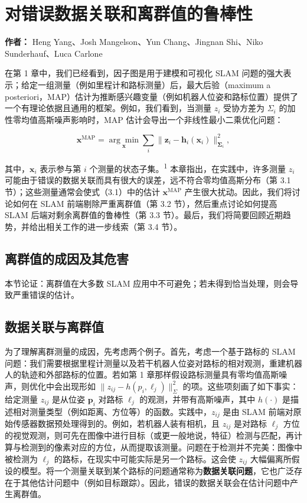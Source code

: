 \chapter{对错误数据关联和离群值的鲁棒性}

\textbf{作者：} Heng Yang、Josh Mangelson、Yun Chang、Jingnan Shi、Niko Sunderhauf、Luca Carlone

在第 1 章中，我们已经看到，因子图是用于建模和可视化 SLAM 问题的强大表示；给定一组测量（例如里程计和路标测量）后，最大后验（maximum a posteriori，MAP）估计为推断感兴趣变量（例如机器人位姿和路标位置）提供了一个有理论依据且通用的框架。例如，我们看到，当测量 $z _ { i }$ 受协方差为 $\Sigma _ { i }$ 的加性零均值高斯噪声影响时，MAP 估计会导出一个非线性最小二乘优化问题：

\begin{equation}
\boldsymbol {x} ^ {\mathrm{MAP}} = \underset {\boldsymbol {x}} {\arg \min} \sum_ {i} \| \boldsymbol {z} _ {i} - \boldsymbol {h} _ {i} (\boldsymbol {x} _ {i}) \| _ {\boldsymbol {\Sigma} _ {i}} ^ {2},\tag{3.1}
\end{equation}

其中，$\pmb { x } _ { i }$ 表示参与第 $i$ 个测量的状态子集。\textsuperscript{1} 本章指出，在实践中，许多测量 $z _ { i }$ 可能由于错误的数据关联而具有很大的误差，远不符合零均值高斯分布（第 3.1 节）；这些测量通常会使式（3.1）中的估计 $\scriptstyle \mathbf { x } ^ { \mathrm { M A P } }$ 产生很大扰动。因此，我们将讨论如何在 SLAM 前端剔除严重离群值（第 3.2 节），然后重点讨论如何提高 SLAM 后端对剩余离群值的鲁棒性（第 3.3 节）。最后，我们将简要回顾近期趋势，并给出相关工作的进一步线索（第 3.4 节）。

\section{离群值的成因及其危害}

本节论证：离群值在大多数 SLAM 应用中不可避免；若未得到恰当处理，则会导致严重错误的估计。

\section{数据关联与离群值}

为了理解离群测量的成因，先考虑两个例子。首先，考虑一个基于路标的 SLAM 问题：我们需要根据里程计测量以及若干机器人位姿对路标的相对观测，重建机器人的轨迹和外部路标的位置。若如第 1 章那样假设路标测量具有零均值高斯噪声，则优化中会出现形如 $\| z _ { i j } - h ( p _ { i } , \ell _ { j } ) \| _ { \Sigma } ^ { 2 }$ 的项。这些项刻画了如下事实：给定测量 $z _ { i j }$ 是从位姿 $\pmb { p } _ { i }$ 对路标 $\ell _ { j }$ 的观测，并带有高斯噪声，其中 $h ( \cdot )$ 是描述相对测量类型（例如距离、方位等）的函数。实践中，$z _ { i j }$ 是由 SLAM 前端对原始传感器数据预处理得到的。例如，若机器人装有相机，且 $z _ { i j }$ 是对路标 $\ell _ { j }$ 方位的视觉观测，则可先在图像中进行目标（或更一般地说，特征）检测与匹配，再计算与检测到的像素对应的方位，从而提取该测量。问题在于检测并不完美：图像中被检测为 $\ell _ { j }$ 的路标，在现实中可能实际是另一个路标。这会使 $z _ { i j }$ 大幅偏离所假设的模型。将一个测量关联到某个路标的问题通常称为\textbf{数据关联问题}，它也广泛存在于其他估计问题中（例如目标跟踪）。因此，错误的数据关联会在估计问题中产生离群值。

